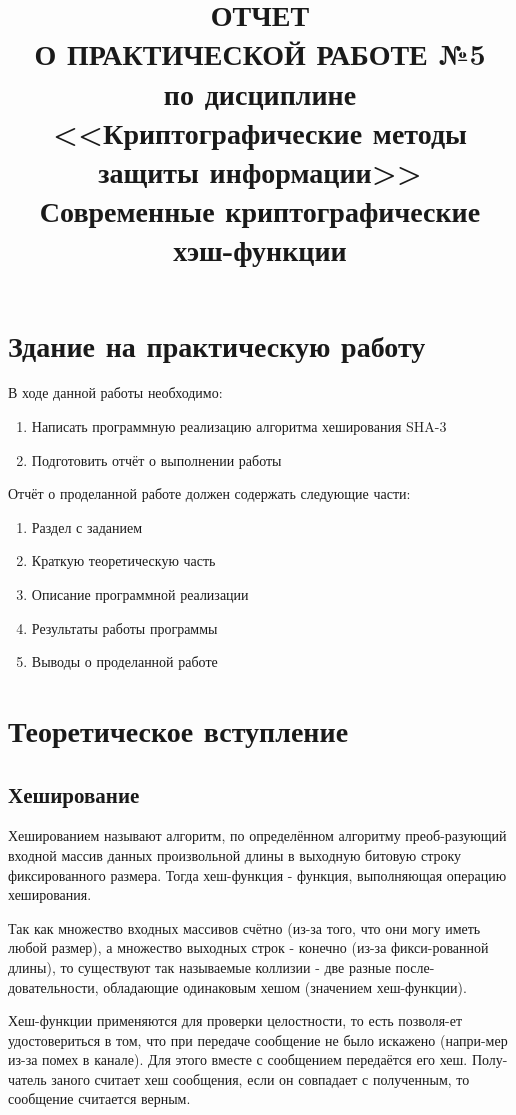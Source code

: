\documentclass[a4paper]{article}
\title{
  ОТЧЕТ \\
  О ПРАКТИЧЕСКОЙ РАБОТЕ №5 \\
  по дисциплине <<Криптографические методы защиты информации>> \\
  Современные криптографические хэш-функции
}
\begin{document}
  \templatedtitlepage
  
  \toc

  \section{Здание на практическую работу}
  
  В ходе данной работы необходимо:
  \begin{enumerate}
    \item Написать программную реализацию алгоритма хеширования SHA-3
    \item Подготовить отчёт о выполнении работы 
  \end{enumerate}

  Отчёт о проделанной работе должен содержать следующие части:
  \begin{enumerate}
    \item Раздел с заданием
    \item Краткую теоретическую часть
    \item Описание программной реализации
    \item Результаты работы программы
    \item Выводы о проделанной работе
  \end{enumerate}

  \newpage
  \section{Теоретическое вступление}

  \subsection{Хеширование}

  Хешированием называют алгоритм, по определённом алгоритму преоб-разующий
  входной массив данных произвольной длины в выходную битовую строку
  фиксированного размера. Тогда хеш-функция - функция, выполняющая операцию
  хеширования.

  Так как множество входных массивов счётно (из-за того, что они могу иметь
  любой размер), а множество выходных строк - конечно (из-за фикси-рованной
  длины), то существуют так называемые коллизии - две разные после-довательности,
  обладающие одинаковым хешом (значением хеш-функции).

  Хеш-функции применяются для проверки целостности, то
  есть позволя-ет удостовериться в том, что при передаче сообщение не было искажено
  (напри-мер из-за помех в канале). Для этого вместе с сообщением передаётся
  его хеш. Полу-чатель заного считает хеш сообщения, если он совпадает с полученным,
  то сообщение считается верным. 
\end{document}
